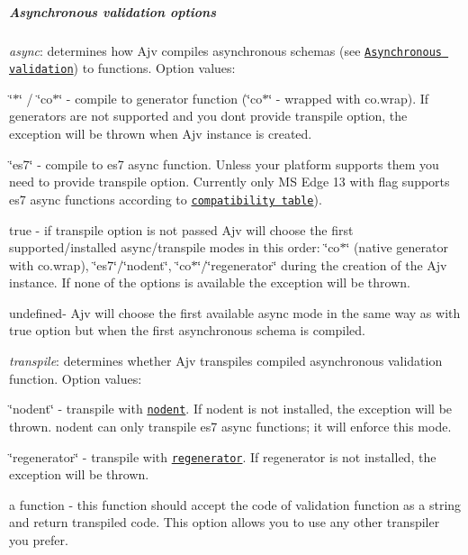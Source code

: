 \subparagraph*{Asynchronous validation options}


\begin{DoxyItemize}
\item {\itshape async}\+: determines how Ajv compiles asynchronous schemas (see \href{#asynchronous-validation}{\tt Asynchronous validation}) to functions. Option values\+:
\begin{DoxyItemize}
\item {\ttfamily \char`\"{}$\ast$\char`\"{}} / {\ttfamily \char`\"{}co$\ast$\char`\"{}} -\/ compile to generator function (\char`\"{}co$\ast$\char`\"{} -\/ wrapped with {\ttfamily co.\+wrap}). If generators are not supported and you don\textquotesingle{}t provide {\ttfamily transpile} option, the exception will be thrown when Ajv instance is created.
\item {\ttfamily \char`\"{}es7\char`\"{}} -\/ compile to es7 async function. Unless your platform supports them you need to provide {\ttfamily transpile} option. Currently only MS Edge 13 with flag supports es7 async functions according to \href{http://kangax.github.io/compat-table/es7/}{\tt compatibility table}).
\item {\ttfamily true} -\/ if transpile option is not passed Ajv will choose the first supported/installed async/transpile modes in this order\+: \char`\"{}co$\ast$\char`\"{} (native generator with co.\+wrap), \char`\"{}es7\char`\"{}/\char`\"{}nodent\char`\"{}, \char`\"{}co$\ast$\char`\"{}/\char`\"{}regenerator\char`\"{} during the creation of the Ajv instance. If none of the options is available the exception will be thrown.
\item {\ttfamily undefined}-\/ Ajv will choose the first available async mode in the same way as with {\ttfamily true} option but when the first asynchronous schema is compiled.
\end{DoxyItemize}
\item {\itshape transpile}\+: determines whether Ajv transpiles compiled asynchronous validation function. Option values\+:
\begin{DoxyItemize}
\item {\ttfamily \char`\"{}nodent\char`\"{}} -\/ transpile with \href{https://github.com/MatAtBread/nodent}{\tt nodent}. If nodent is not installed, the exception will be thrown. nodent can only transpile es7 async functions; it will enforce this mode.
\item {\ttfamily \char`\"{}regenerator\char`\"{}} -\/ transpile with \href{https://github.com/facebook/regenerator}{\tt regenerator}. If regenerator is not installed, the exception will be thrown.
\item a function -\/ this function should accept the code of validation function as a string and return transpiled code. This option allows you to use any other transpiler you prefer.
\end{DoxyItemize}
\end{DoxyItemize}

